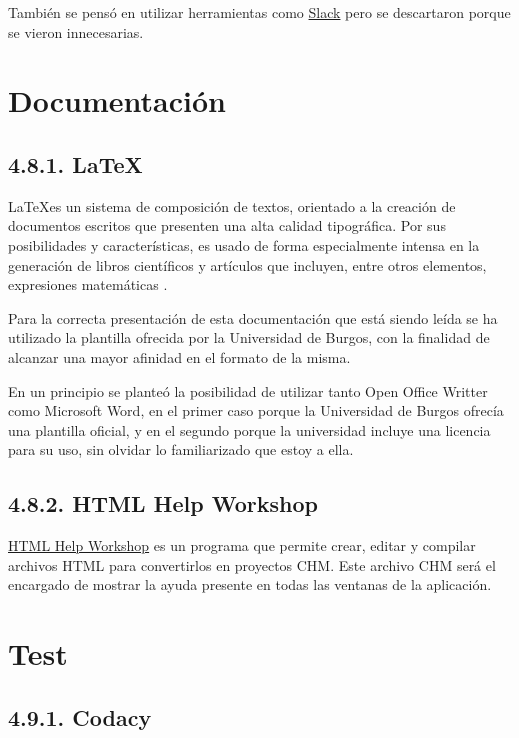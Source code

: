También se pensó en utilizar herramientas como \href{https://slack.com/intl/es-es/}{Slack} pero se descartaron porque se vieron innecesarias.

\section{Documentación}

\subsection{4.8.1. LaTeX}

\LaTeX es un sistema de composición de textos, orientado a la creación de documentos escritos que presenten una alta calidad tipográfica. Por sus posibilidades y características, es usado de forma especialmente intensa en la generación de libros científicos y artículos que incluyen, entre otros elementos, expresiones matemáticas \cite{wiki:latex}.

Para la correcta presentación de esta documentación que está siendo leída se ha utilizado la plantilla ofrecida por la Universidad de Burgos, con la finalidad de alcanzar una mayor afinidad en el formato de la misma.

En un principio se planteó la posibilidad de utilizar tanto Open Office Writter como Microsoft Word, en el primer caso porque la Universidad de Burgos ofrecía una plantilla oficial, y en el segundo porque la universidad incluye una licencia para su uso, sin olvidar lo familiarizado que estoy a ella.

\subsection{4.8.2. HTML Help Workshop}

\href{https://www.microsoft.com/en-us/download/details.aspx?id=21138}{HTML Help Workshop} es un programa que permite crear, editar y compilar archivos HTML para convertirlos en proyectos CHM. Este archivo CHM será el encargado de mostrar la ayuda presente en todas las ventanas de la aplicación.


\section{Test}

\subsection{4.9.1. Codacy}

